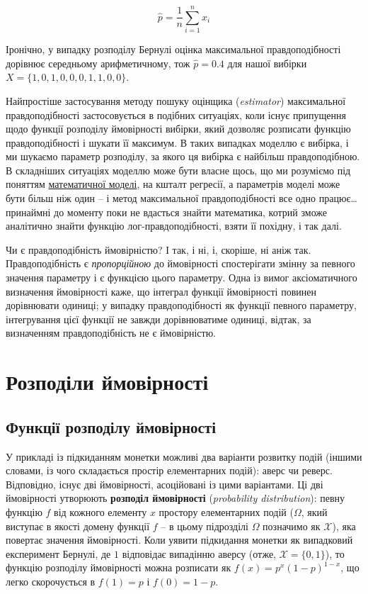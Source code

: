 \documentclass[
  11pt,
]{book}
\begin{document}
\[\hat{p} = \frac{1}{n} \sum \limits_{i=1}^n x_i\]

Іронічно, у випадку розподілу Бернулі оцінка максимальної правдоподібності дорівнює середньому арифметичному, тож \(\hat{p} = 0.4\) для нашої вибірки \(X = \{1, 0, 1, 0, 0, 0, 1, 1, 0, 0\}\).

Найпростіше застосування методу пошуку оцінщика (\emph{estimator}) максимальної правдоподібності застосовується в подібних ситуаціях, коли існує припущення щодо функції розподілу ймовірності вибірки, який дозволяє розписати функцію правдоподібності і шукати її максимум. В таких випадках моделлю є вибірка, і ми шукаємо параметр розподілу, за якого ця вибірка є найбільш правдоподібною. В складніших ситуаціях моделлю може бути власне щось, що ми розуміємо під поняттям \hyperref[stat-models]{математичної моделі}, на кшталт регресії, а параметрів моделі може бути більш ніж один -- і метод максимальної правдоподібності все одно працює\ldots{} принаймні до моменту поки не вдасться знайти математика, котрий зможе аналітично знайти функцію лог-правдоподібності, взяти її похідну, і так далі.

Чи є правдоподібність ймовірністю? І так, і ні, і, скоріше, ні аніж так. Правдоподібність є \emph{пропорційною} до ймовірності спостерігати змінну за певного значення параметру і є функцією цього параметру. Одна із вимог аксіоматичного визначення ймовірності каже, що інтеграл функції ймовірності повинен дорівнювати одиниці; у випадку правдоподібності як функції певного параметру, інтегрування цієї функції не завжди дорівнюватиме одиниці, відтак, за визначенням правдоподібність не є ймовірністю.

\section{Розподіли ймовірності}\label{pdf-pmf}

\subsection{Функції розподілу ймовірності}\label{pdfs}

У прикладі із підкиданням монетки можливі два варіанти розвитку подій (іншими словами, із чого складається простір елементарних подій): аверс чи реверс. Відповідно, існує дві ймовірності, асоційовані із цими варіантами. Ці дві ймовірності утворюють \textbf{розподіл ймовірності} (\emph{probability distribution}): певну функцію \(f\) від кожного елементу \(x\) простору елементарних подій (\(\Omega\), який виступає в якості домену функції \(f\) -- в цьому підрозділі \(\Omega\) позначимо як \(\mathcal{X}\)), яка повертає значення ймовірності. Коли уявити підкидання монетки як випадковий експеримент Бернулі, де \(1\) відповідає випадінню аверсу (отже, \(\mathcal{X} = \{0, 1\}\)), то функцію розподілу ймовірності можна розписати як \(f(x) = p^x (1-p)^{1-x}\), що легко скорочується в \(f(1) = p\) і \(f(0) = 1 - p\).
\end{document}
